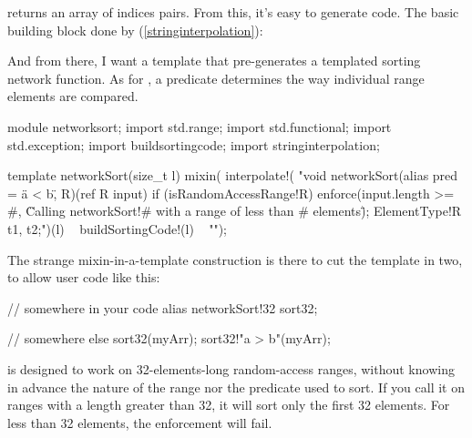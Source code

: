  returns an array of indices pairs. From this, it's easy to generate code. The basic building block done by  (\ref{stringinterpolation}):


And from there, I want a template that pre-generates a templated sorting network function. As for , a predicate  determines the way individual range elements are compared.

\begin{dcode}
module networksort;
import std.range;
import std.functional;
import std.exception;
import buildsortingcode;
import stringinterpolation;

template networkSort(size_t l)
{
    mixin(
interpolate!(
    "void networkSort(alias pred = \"a < b\", R)(ref R input)
     if (isRandomAccessRange!R)
     { 
         enforce(input.length >= #, 
                 \"Calling networkSort!# with a range of less than # elements\");
	      ElementType!R t1, t2;")(l)
      ~ buildSortingCode!(l) 
 ~ "}");
}
\end{dcode}

The strange mixin-in-a-template construction is there to cut the template in two, to allow user code like this:

\begin{dcode}
// somewhere in your code
alias networkSort!32 sort32;

// somewhere else
sort32(myArr);
sort32!"a > b"(myArr);
\end{dcode}

 is designed to work on 32-elements-long random-access ranges, without knowing in advance the nature of the range nor the predicate used to sort. If you call it on ranges with a length greater than 32, it will sort only the first 32 elements. For less than 32 elements, the enforcement will fail.

